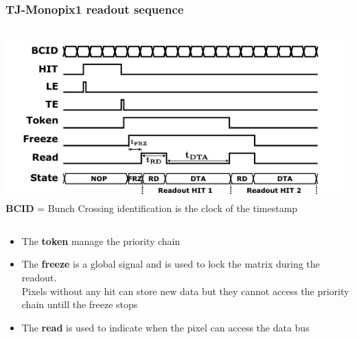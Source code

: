     \begin{frame}[noframenumbering]
        \frametitle{TJ-Monopix1 readout sequence}
        \begin{columns}
            \centering
            \includegraphics[width=1.\linewidth]{figures/Monopix1/readout_timing.png}
        \textbf{BCID} = Bunch Crossing identification
        is the clock of the timestamp   \\
        \end{columns}
        \begin{itemize}
            \item The \textbf{token} manage the priority chain
            \item The \textbf{freeze} is a global signal and is used to lock the matrix during the readout. \\
            \small Pixels without any hit can store new data but they cannot access the priority chain untill the freeze stops
            \item The \textbf{read} is used to indicate when the pixel can access the data bus
        \end{itemize}
    \end{frame} 


